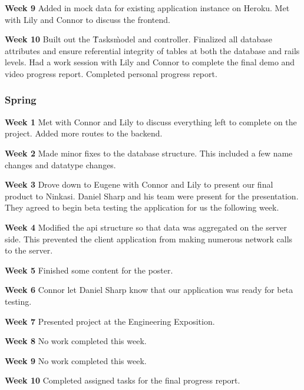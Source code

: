 \noindent\medskip\textbf{Week 9}
Added in mock data for existing application instance on Heroku.
Met with Lily and Connor to discuss the frontend.

\noindent\medskip\textbf{Week 10}
Built out the \`Tasks\` model and controller.
Finalized all database attributes and ensure referential integrity of tables at both the database and rails levels.
Had a work session with Lily and Connor to complete the final demo and video progress report.
Completed personal progress report.

\subsubsection{Spring}
\hfill\break
\noindent\medskip\textbf{Week 1}
Met with Connor and Lily to discuss everything left to complete on the project.
Added more routes to the backend.

\noindent\medskip\textbf{Week 2}
Made minor fixes to the database structure.
This included a few name changes and datatype changes.

\noindent\medskip\textbf{Week 3}
Drove down to Eugene with Connor and Lily to present our final product to Ninkasi.
Daniel Sharp and his team were present for the presentation.
They agreed to begin beta testing the application for us the following week.

\noindent\medskip\textbf{Week 4}
Modified the api structure so that data was aggregated on the server side.
This prevented the client application from making numerous network calls to the server.

\noindent\medskip\textbf{Week 5}
Finished some content for the poster.

\noindent\medskip\textbf{Week 6}
Connor let Daniel Sharp know that our application was ready for beta testing.

\noindent\medskip\textbf{Week 7}
Presented project at the Engineering Exposition.

\noindent\medskip\textbf{Week 8}
No work completed this week.

\noindent\medskip\textbf{Week 9}
No work completed this week.

\noindent\medskip\textbf{Week 10}
Completed assigned tasks for the final progress report.
